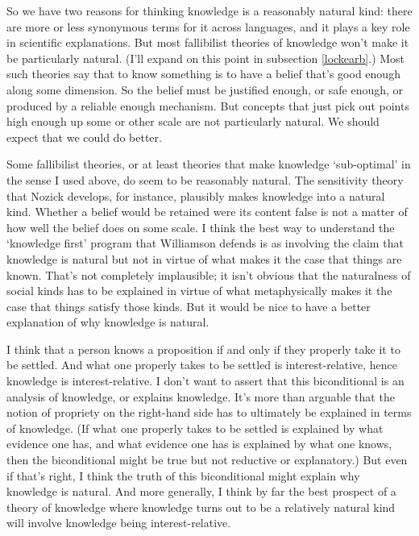 \documentclass[
  11pt,
]{book}
\begin{document}
So we have two reasons for thinking knowledge is a reasonably natural kind: there are more or less synonymous terms for it across languages, and it plays a key role in scientific explanations. But most fallibilist theories of knowledge won't make it be particularly natural. (I'll expand on this point in subsection \ref{lockearb}.) Most such theories say that to know something is to have a belief that's good enough along some dimension. So the belief must be justified enough, or safe enough, or produced by a reliable enough mechanism. But concepts that just pick out points high enough up some or other scale are not particularly natural. We should expect that we could do better.

Some fallibilist theories, or at least theories that make knowledge `sub-optimal' in the sense I used above, do seem to be reasonably natural. The sensitivity theory that Nozick \citeyearpar{Nozick1981} develops, for instance, plausibly makes knowledge into a natural kind. Whether a belief would be retained were its content false is not a matter of how well the belief does on some scale. I think the best way to understand the `knowledge first' program that Williamson \citeyearpar{Williamson2000} defends is as involving the claim that knowledge is natural but not in virtue of what makes it the case that things are known. That's not completely implausible; it isn't obvious that the naturalness of social kinds has to be explained in virtue of what metaphysically makes it the case that things satisfy those kinds. But it would be nice to have a better explanation of why knowledge is natural.

I think that a person knows a proposition if and only if they properly take it to be settled. And what one properly takes to be settled is interest-relative, hence knowledge is interest-relative. I don't want to assert that this biconditional is an analysis of knowledge, or explains knowledge. It's more than arguable that the notion of propriety on the right-hand side has to ultimately be explained in terms of knowledge. (If what one properly takes to be settled is explained by what evidence one has, and what evidence one has is explained by what one knows, then the biconditional might be true but not reductive or explanatory.) But even if that's right, I think the truth of this biconditional might explain why knowledge is natural. And more generally, I think by far the best prospect of a theory of knowledge where knowledge turns out to be a relatively natural kind will involve knowledge being interest-relative.
\end{document}
